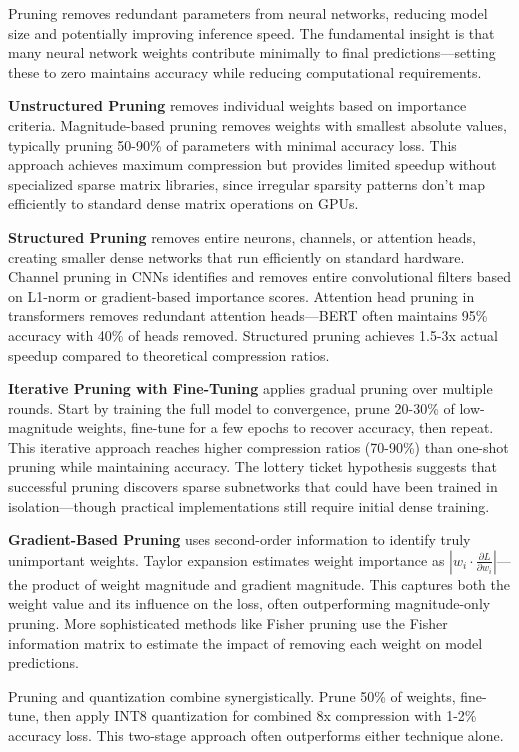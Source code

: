 Pruning removes redundant parameters from neural networks, reducing model size and potentially improving inference speed. The fundamental insight is that many neural network weights contribute minimally to final predictions---setting these to zero maintains accuracy while reducing computational requirements.

\textbf{Unstructured Pruning} removes individual weights based on importance criteria. Magnitude-based pruning removes weights with smallest absolute values, typically pruning 50-90\% of parameters with minimal accuracy loss. This approach achieves maximum compression but provides limited speedup without specialized sparse matrix libraries, since irregular sparsity patterns don't map efficiently to standard dense matrix operations on GPUs.

\textbf{Structured Pruning} removes entire neurons, channels, or attention heads, creating smaller dense networks that run efficiently on standard hardware. Channel pruning in CNNs identifies and removes entire convolutional filters based on L1-norm or gradient-based importance scores. Attention head pruning in transformers removes redundant attention heads---BERT often maintains 95\% accuracy with 40\% of heads removed. Structured pruning achieves 1.5-3x actual speedup compared to theoretical compression ratios.

\textbf{Iterative Pruning with Fine-Tuning} applies gradual pruning over multiple rounds. Start by training the full model to convergence, prune 20-30\% of low-magnitude weights, fine-tune for a few epochs to recover accuracy, then repeat. This iterative approach reaches higher compression ratios (70-90\%) than one-shot pruning while maintaining accuracy. The lottery ticket hypothesis suggests that successful pruning discovers sparse subnetworks that could have been trained in isolation---though practical implementations still require initial dense training.

\textbf{Gradient-Based Pruning} uses second-order information to identify truly unimportant weights. Taylor expansion estimates weight importance as $|w_i \cdot \frac{\partial L}{\partial w_i}|$---the product of weight magnitude and gradient magnitude. This captures both the weight value and its influence on the loss, often outperforming magnitude-only pruning. More sophisticated methods like Fisher pruning use the Fisher information matrix to estimate the impact of removing each weight on model predictions.

Pruning and quantization combine synergistically. Prune 50\% of weights, fine-tune, then apply INT8 quantization for combined 8x compression with 1-2\% accuracy loss. This two-stage approach often outperforms either technique alone.

